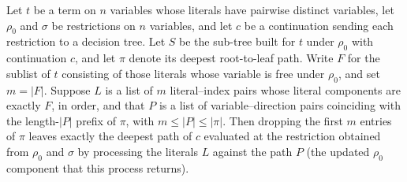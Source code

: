 \begin{lemma}
\label{SwitchingLemma.processClauseLits_termSubTree_drop}
\leanok
{}
Let $t$ be a term on $n$ variables whose literals have pairwise distinct variables, let
$\rho_0$ and $\sigma$ be restrictions on $n$ variables, and let $c$ be a continuation
sending each restriction to a decision tree. Let $S$ be the sub-tree built for $t$ under
$\rho_0$ with continuation $c$, and let $\pi$ denote its deepest root-to-leaf path.
Write $F$ for the sublist of $t$ consisting of those literals whose variable is free
under $\rho_0$, and set $m = |F|$. Suppose $L$ is a list of $m$ literal–index pairs
whose literal components are exactly $F$, in order, and that $P$ is a list of
variable–direction pairs coinciding with the length-$|P|$ prefix of $\pi$, with $m \le
|P| \le |\pi|$. Then dropping the first $m$ entries of $\pi$ leaves exactly the deepest
path of $c$ evaluated at the restriction obtained from $\rho_0$ and $\sigma$ by
processing the literals $L$ against the path $P$ (the updated $\rho_0$ component that
this process returns).
\end{lemma}

